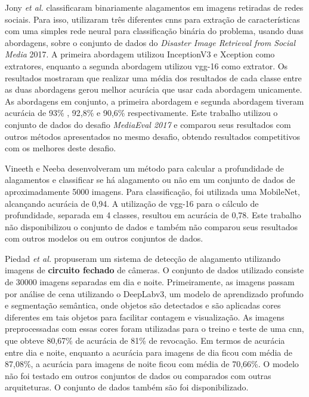 Jony \textit{et al.} \cite{jony2019} classificaram binariamente alagamentos em imagens retiradas de redes sociais. 
Para isso, utilizaram três diferentes \acrshort{cnn}s para extração de características com uma simples rede neural para classificação binária do problema, usando duas abordagens, 
sobre o conjunto de dados do \textit{Disaster Image Retrieval from Social Media} 2017\cite{dirsm2017}. 
A primeira abordagem utilizou InceptionV3 e Xception como extratores, enquanto a segunda abordagem utilizou \acrshort{vgg}-16 como extrator. 
Os resultados mostraram que realizar uma média dos resultados de cada classe entre as duas abordagens gerou melhor acurácia que usar cada abordagem unicamente. 
As abordagens em conjunto, a primeira abordagem e segunda abordagem tiveram acurácia de 93\% , 92,8\% e 90,6\% respectivamente.
Este trabalho utilizou o conjunto de dados do desafio \textit{MediaEval 2017} e comparou seus resultados com outros métodos apresentados no mesmo desafio, obtendo resultados competitivos com os melhores deste desafio.

Vineeth e Neeba \cite{vineeth2021} desenvolveram um método para calcular a profundidade de alagamentos e classificar se há alagamento ou não em um conjunto de dados de aproximadamente 5000 imagens. 
Para classificação, foi utilizada uma MobileNet, alcançando acurácia de 0,94. 
A utilização de \acrshort{vgg}-16 para o cálculo de profundidade, separada em 4 classes, resultou em acurácia de 0,78.
Este trabalho não disponibilizou o conjunto de dados e também não comparou seus resultados com outros modelos ou em outros conjuntos de dados.

Piedad \textit{et al.}\cite{piedad2022} propuseram um sistema de detecção de alagamento utilizando imagens de \textbf{circuito fechado} de câmeras. 
O conjunto de dados utilizado consiste de 30000 imagens separadas em dia e noite.
Primeiramente, as imagens passam por análise de cena utilizando o DeepLabv3, um modelo de aprendizado profundo e segmentação semântica, 
onde objetos são detectados e são aplicadas cores diferentes em tais objetos para facilitar contagem e visualização. 
As imagens preprocessadas com essas cores foram utilizadas para o treino e teste de uma \acrshort{cnn}, que obteve 80,67\% de acurácia de 81\% de revocação. 
Em termos de acurácia entre dia e noite, enquanto a acurácia para imagens de dia ficou com média de 87,08\%, a acurácia para imagens de noite ficou com média de 70,66\%.
O modelo não foi testado em outros conjuntos de dados ou comparados com outras arquiteturas. O conjunto de dados também são foi disponibilizado.

